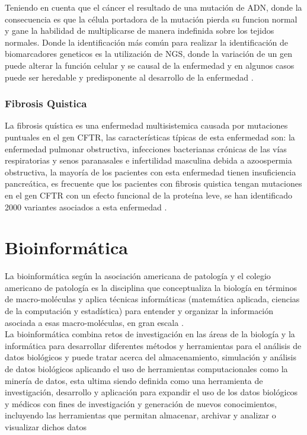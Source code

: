 Teniendo en cuenta que el cáncer el resultado de una mutación de ADN, donde la consecuencia es que la célula portadora de la mutación pierda su funcion normal y gane la habilidad de multiplicarse de manera indefinida sobre los tejidos normales. Donde la identificación más común para realizar la identificación de biomarcadores geneticos es la utilización de NGS, donde la variación de un gen puede alterar la función celular y se causal de la enfermedad y en algunos casos puede ser heredable y predisponente al desarrollo de la enfermedad \cite{Jurca2016,Wenger2017}.


\subsubsection*{Fibrosis Quistica}

La fibrosis quística es una enfermedad multisistemica causada por mutaciones puntuales en el gen CFTR, las características típicas de esta enfermedad son: la enfermedad pulmonar obstructiva, infecciones bacterianas crónicas de las vías respiratorias y senos paranasales e infertilidad masculina debida  a azoospermia obstructiva, la mayoría de los pacientes con esta enfermedad tienen insuficiencia pancreática, es frecuente que los pacientes con fibrosis quistica tengan mutaciones en el gen CFTR con un efecto funcional de la proteína leve, se han identificado 2000 variantes asociados a esta enfermedad \cite{Terlizzi2017}. 


\section{Bioinformática}


La bioinformática según la asociación americana de patología y el colegio americano de patología es la disciplina que conceptualiza la biología en términos de macro-moléculas y aplica técnicas informáticas (matemática aplicada, ciencias de la computación y estadística) para entender y organizar la información asociada a esas macro-moléculas, en gran escala \cite{Roy2018}.\\  
 
La bioinformática combina retos de investigación en las áreas de la biología y la informática para desarrollar diferentes métodos y herramientas para el análisis de datos biológicos y puede tratar acerca  del almacenamiento, simulación y análisis de datos biológicos aplicando el uso de herramientas computacionales  como la minería de datos, esta ultima siendo definida como una herramienta de investigación, desarrollo y aplicación para expandir el uso de los datos biológicos y médicos con fines de investigación y generación de nuevos conocimientos, incluyendo las herramientas que permitan almacenar, archivar y analizar o visualizar dichos datos \cite{Littlefield} \\


